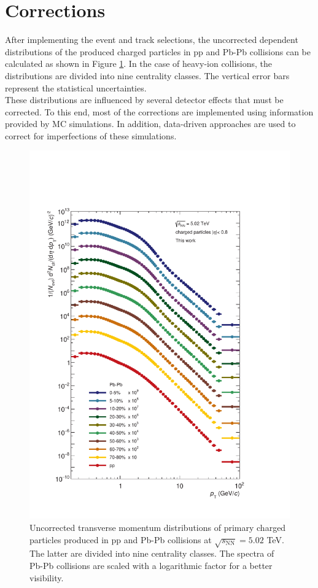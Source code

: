 \documentclass[12pt,a4paper]{report}
\begin{document}
\section{Corrections}
After implementing the event and track selections, the uncorrected \pt dependent distributions of the produced charged particles in pp and Pb-Pb collisions can be calculated as shown in Figure \ref{uncorrSpec}. In the case of heavy-ion collisions, the \pt distributions are divided into nine centrality classes. The vertical error bars represent the statistical uncertainties.\\
These \pt distributions are influenced by several detector effects that must be corrected. To this end, most of the corrections are implemented using information provided by MC simulations. In addition, data-driven approaches are used to correct for imperfections of these simulations. \\
\begin{figure}[htb!]
\centering
\includegraphics[width=13cm]{Plots/uncorrectedSpectra.pdf}  
\caption{Uncorrected transverse momentum distributions of primary charged particles produced in pp and Pb-Pb collisions at $\sqrt{s_\text{NN}} = 5.02$ TeV. The latter are divided into nine centrality classes. The \pt spectra of Pb-Pb collisions are scaled with a logarithmic factor for a better visibility.}
\label{uncorrSpec}
\end{figure}
\end{document}
